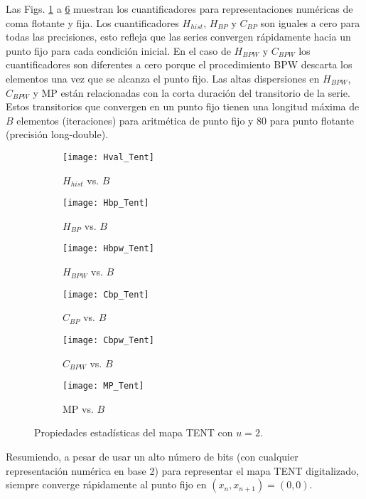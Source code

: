 Las Figs. \ref{fig:Hval_Tent} a \ref{fig:MP_Tent} muestran los cuantificadores para representaciones numéricas de coma flotante y fija.
Los cuantificadores $H_{hist}$, $H_{BP}$ y $C_{BP}$ son iguales a cero para todas las precisiones, esto refleja que las series convergen rápidamente hacia un punto fijo para cada condición inicial.
En el caso de $H_{BPW}$ y $C_{BPW}$ los cuantificadores son diferentes a cero porque el procedimiento BPW descarta los elementos una vez que se alcanza el punto fijo.
Las altas dispersiones en $H_{BPW}$, $C_{BPW}$ y MP están relacionadas con la corta duración del transitorio de la serie.
Estos transitorios que convergen en un punto fijo tienen una longitud máxima de $B$ elementos (iteraciones) para aritmética de punto fijo y $80$ para punto flotante (precisión long-double).
%
\begin{figure}[htpb]
	\centering
	\begin{subfigure}[b]{0.49\textwidth}
		\texttt{[image: Hval\_Tent]}
		\caption{$H_{hist}$ vs. $B$}
		\label{fig:Hval_Tent}
	\end{subfigure}
	\begin{subfigure}[b]{0.49\textwidth}
		\texttt{[image: Hbp\_Tent]}
		\caption{$H_{BP}$ vs. $B$}
		\label{fig:Hbp_Tent}
	\end{subfigure}
	\begin{subfigure}[b]{0.49\textwidth}
		\texttt{[image: Hbpw\_Tent]}
		\caption{$H_{BPW}$ vs. $B$}
		\label{fig:Hbpw_Tent}
	\end{subfigure}
	\begin{subfigure}[b]{0.49\textwidth}
		\texttt{[image: Cbp\_Tent]}
		\caption{$C_{BP}$ vs. $B$}
		\label{fig:Cbp_Tent}
	\end{subfigure}
	\begin{subfigure}[b]{0.49\textwidth}
		\texttt{[image: Cbpw\_Tent]}
		\caption{$C_{BPW}$ vs. $B$}
		\label{fig:Cbpw_Tent}
	\end{subfigure}
	\begin{subfigure}[b]{0.49\textwidth}
		\texttt{[image: MP\_Tent]}
		\caption{MP vs. $B$}
		\label{fig:MP_Tent}
	\end{subfigure}
	\caption{Propiedades estadísticas del mapa TENT con $u=2$.}
	\label{fig:TENT_QuantiB}
\end{figure}
%
Resumiendo, a pesar de usar un alto número de bits (con cualquier representación numérica en base 2) para representar el mapa TENT digitalizado, siempre converge rápidamente al punto fijo en $(x_n, x_{n+1}) = (0, 0)$.

